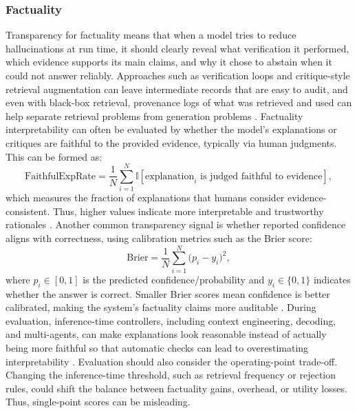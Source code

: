 \subsubsection{Factuality}
Transparency for factuality means that when a model tries to reduce hallucinations at run time, it should clearly reveal what verification it performed, which evidence supports its main claims, and why it chose to abstain when it could not answer reliably. Approaches such as verification loops and critique-style retrieval augmentation can leave intermediate records that are easy to audit, and even with black-box retrieval, provenance logs of what was retrieved and used can help separate retrieval problems from generation problems \citep{dhuliawala2024chain, asai2024self, shi2024replug, wan2024dell}. Factuality interpretability can often be evaluated by whether the model’s explanations or critiques are faithful to the provided evidence, typically via human judgments. This can be formed as:
\[
\mathrm{FaithfulExpRate}
=\frac{1}{N}\sum_{i=1}^{N}\mathbb{I}\!\left[\text{explanation}_i \text{ is judged faithful to evidence}\right],
\]
which measures the fraction of explanations that humans consider evidence-consistent. Thus, higher values indicate more interpretable and trustworthy rationales
\citep{kim2024llmsproducefaithfulexplanations, asai2024self}. Another common transparency signal is whether reported confidence aligns with correctness, using calibration metrics such as the Brier score:
\[
\mathrm{Brier}
=\frac{1}{N}\sum_{i=1}^{N}\big(p_i-y_i\big)^2,
\]
where $p_i\in[0,1]$ is the predicted confidence/probability and $y_i\in\{0,1\}$ indicates whether the answer is correct.
Smaller Brier scores mean confidence is better calibrated, making the system’s factuality claims more auditable
\citep{10.5555/3692070.3693020, yang2024confidencecalibrationrationalizationllms}. During evaluation, inference-time controllers, including context engineering, decoding, and multi-agents, can make explanations look reasonable instead of actually being more faithful so that automatic checks can lead to overestimating interpretability \citep{yang2024confidencecalibrationrationalizationllms, kim2024llmsproducefaithfulexplanations}. 
Evaluation should also consider the operating-point trade-off. 
Changing the inference-time threshold, such as retrieval frequency or rejection rules, could shift the balance between factuality gains, overhead, or utility losses. Thus, single-point scores can be misleading.

